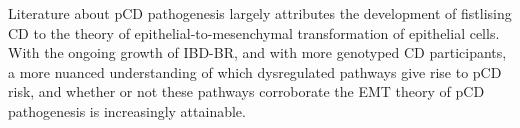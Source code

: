 Literature about pCD pathogenesis largely attributes the development of fistlising CD to the theory of epithelial-to-mesenchymal transformation of epithelial cells. With the ongoing growth of IBD-BR, and with more genotyped CD participants, a more nuanced understanding of which dysregulated pathways give rise to pCD risk, and whether or not these pathways corroborate the EMT theory of pCD pathogenesis is increasingly attainable.











